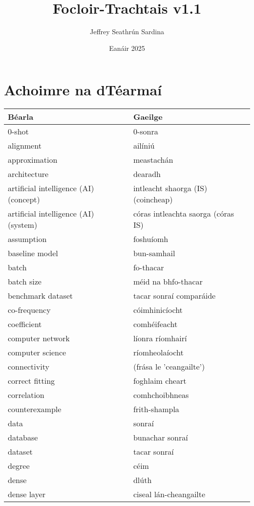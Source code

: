 \documentclass{article}
\title{Focloir-Trachtais v1.1}
\author{Jeffrey Seathrún Sardina}
\date{Eanáir 2025}
\begin{document}
            \maketitle
        
\section{Achoimre na dTéarmaí}\begin{longtable}{|l|l|}
	\hline
		\textbf{Béarla} & \textbf{Gaeilge}\\ \hline 
		0-shot&0-sonra\\ \hline 
		alignment&ailíniú\\ \hline 
		approximation&meastachán\\ \hline 
		architecture&dearadh\\ \hline 
		artificial intelligence (AI) (concept)&intleacht shaorga (IS) (coincheap)\\ \hline 
		artificial intelligence (AI) (system)&córas intleachta saorga (córas IS)\\ \hline 
		assumption&foshuíomh\\ \hline 
		baseline model&bun-samhail\\ \hline 
		batch&fo-thacar\\ \hline 
		batch size&méid na bhfo-thacar\\ \hline 
		benchmark dataset&tacar sonraí comparáide\\ \hline 
		co-frequency&cóimhinicíocht\\ \hline 
		coefficient&comhéifeacht\\ \hline 
		computer network&líonra ríomhairí\\ \hline 
		computer science&ríomheolaíocht\\ \hline 
		connectivity&(frása le 'ceangailte')\\ \hline 
		correct fitting&foghlaim cheart\\ \hline 
		correlation&comhchoibhneas\\ \hline 
		counterexample&frith-shampla\\ \hline 
		data&sonraí\\ \hline 
		database&bunachar sonraí\\ \hline 
		dataset&tacar sonraí\\ \hline 
		degree&céim\\ \hline 
		dense&dlúth\\ \hline 
		dense layer&ciseal lán-cheangailte\\ \hline 

\end{longtable}
\end{document}
